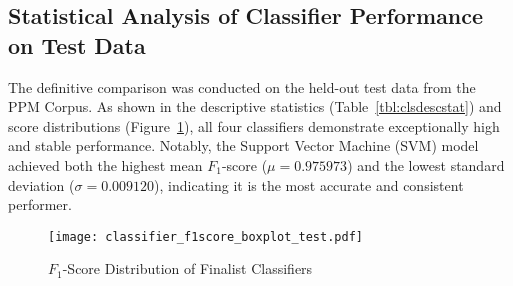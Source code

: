 \subsection{Statistical Analysis of Classifier Performance on Test Data}\label{ch:4.5.3}
The definitive comparison was conducted on the held-out test data from the PPM Corpus. As shown in the descriptive statistics (Table~\ref{tbl:clsdescstat}) and score distributions (Figure~\ref{fig:clscoredist}), all four classifiers demonstrate exceptionally high and stable performance. Notably, the Support Vector Machine (SVM) model achieved both the highest mean \(F_1\)-score (\(\mu = 0.975973\)) and the lowest standard deviation (\(\sigma = 0.009120\)), indicating it is the most accurate and consistent performer.
\begin{figure}[tb]
    \captionsetup{skip=5pt}
    \centering
    \texttt{[image: classifier\_f1score\_boxplot\_test.pdf]}
    \caption{\(F_1\)-Score Distribution of Finalist Classifiers}
    \label{fig:clscoredist}
\end{figure}
\begin{table}[tb]
    \captionsetup{skip=5pt}
    \caption{Model Specifications and Performance}
    \label{tbl:clsdescstat}
    \centering
\end{table}

